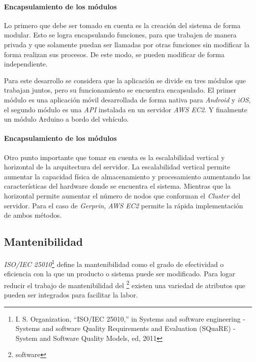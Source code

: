 \paragraph{Encapsulamiento de los módulos\\}

Lo primero que debe ser tomado en cuenta es la creación del sistema de forma modular. Esto se logra encapsulando funciones, para que trabajen de manera privada y que solamente puedan ser llamadas por otras funciones sin modificar la forma realizan sus procesos. De este modo, se pueden modificar de forma independiente. 

Para este desarrollo se considera que la aplicación se divide en tres módulos que trabajan juntos, pero su funcionamiento se encuentra encapsulado. El primer módulo es una aplicación móvil desarrollada de forma nativa para \emph{Android} y \emph{iOS}, el segundo módulo es una \emph{API} instalada en un servidor \emph{AWS EC2}. Y finalmente un módulo Arduino a bordo del vehículo. 

\paragraph{Encapsulamiento de los módulos\\}

Otro punto importante que tomar en cuenta es la escalabilidad vertical y horizontal de la arquitectura del servidor. La escalabilidad vertical permite aumentar la capacidad física de almacenamiento y procesamiento aumentando las características del hardware donde se encuentra el sistema. Mientras que la horizontal permite aumentar el número de nodos que conforman el \emph{Cluster} del servidor. Para el caso de \emph{Gerprin}, \emph{AWS EC2} permite la rápida implementación de ambos métodos.

\subsection{Mantenibilidad}

\emph{ISO/IEC 25010}\footnote{I. S. Organization, “ISO/IEC 25010,” in Systems and software engineering - Systems and software Quality Requirements and Evaluation (SQuaRE) - System and Software Quality Models, ed, 2011} define la mantenibilidad como el grado de efectividad o eficiencia con la que un producto o sistema puede ser modificado. Para logar reducir el trabajo de mantenibilidad del \footnote{software} existen una variedad de atributos que pueden ser integrados para facilitar la labor. 

